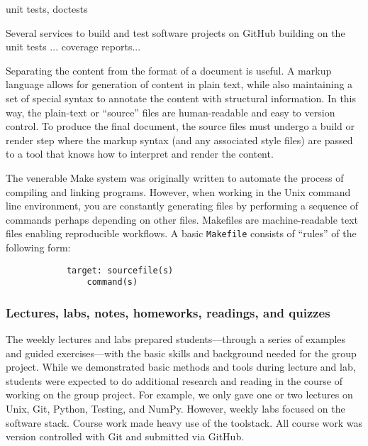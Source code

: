 unit tests, doctests


Several services to build and test software projects on GitHub 
building on the unit tests ...
coverage reports...

Separating the content from the format of a document is useful.
A markup language allows for generation of content in plain text, while also
maintaining a set of special syntax to annotate the content with structural
information.
In this way, the plain-text or ``source'' files are human-readable and easy to
version control.
To produce the final document, the source files must undergo a build or render
step where the markup syntax (and any associated style files) are passed to a
tool that knows how to interpret and render the content.


The venerable Make system was originally written to automate the process
of compiling and linking programs.
However, when working in the Unix command line environment, you are constantly
generating files by performing a sequence of commands perhaps depending on
other files.
Makefiles are machine-readable text files enabling reproducible workflows.
A basic \texttt{Makefile} consists of ``rules'' of the following form:
\begin{verbatim}
            target: sourcefile(s)
                command(s)
\end{verbatim}

\subsubsection{Lectures, labs, notes, homeworks, readings, and quizzes}

The weekly lectures and labs prepared students---through a
series of examples and guided exercises---with the basic skills and
background needed for the group project.
While we demonstrated basic methods and tools during lecture and lab,
students were expected to do additional research and reading in the course
of working on the group project.
For example, we only gave one or two lectures on Unix, Git, Python, Testing, and NumPy.
However, weekly labs focused on the software stack.
Course work made heavy use of the toolstack.
All course work was version controlled with Git and submitted via GitHub. 

